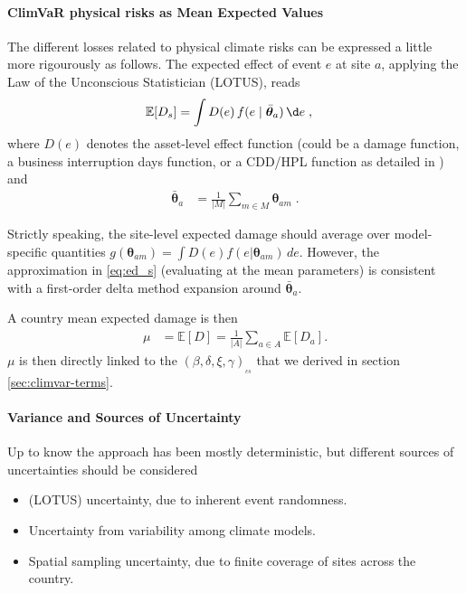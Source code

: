 \paragraph{ClimVaR physical risks as Mean Expected Values}

The different losses related to physical climate risks can be expressed a little more rigourously as follows. The expected effect of event $e$ at site $a$, applying the Law of the Unconscious Statistician (LOTUS), reads
\begin{align}
\mathbb{E}[D_s] &= \int D(e)\, f(e \mid \bar{\bm{\theta}}_a)\, \d e\;,  \label{eq:ed_s}
\end{align}
where $D(e)$ denotes the asset-level effect function (could be a damage function, a business interruption days function, or a CDD/HPL function as detailed in \citet{epelbaum2025}) and
\begin{align}
\bar{\bm{\theta}}_a &= \frac{1}{|M|}\sum_{m \in M} \bm{\theta}_{am}\;.  \label{eq:mean_theta}
\end{align}


Strictly speaking, the site-level expected damage should average over model-specific quantities $ g(\bm{\theta}_{am}) = \int D(e)f(e|\bm{\theta}_{am})\,d e$.
However, the approximation in \eqref{eq:ed_s} (evaluating at the mean parameters) is consistent with a first-order delta method expansion around $\bar{\bm{\theta}}_a$.

\vspace{0.2cm}

A country mean expected damage is then
\begin{align}
\mu &= \mathbb{E}[D]= \frac{1}{|A|}\sum_{a \in A} \mathbb{E}[D_a]. \label{eq:mean_country}
\end{align}
$\mu$ is then directly linked to the $(\beta,\delta,\xi,\gamma)_{_{cs}}$ that we derived in section \ref{sec:climvar-terms}.

\paragraph{Variance and Sources of Uncertainty}

Up to know the approach has been mostly deterministic, but different sources of uncertainties should be considered
\begin{itemize}
    \item (LOTUS) uncertainty, due to inherent event randomness.
    \item Uncertainty from variability among climate models.
    \item Spatial sampling uncertainty, due to finite coverage of sites across the country.
\end{itemize}

